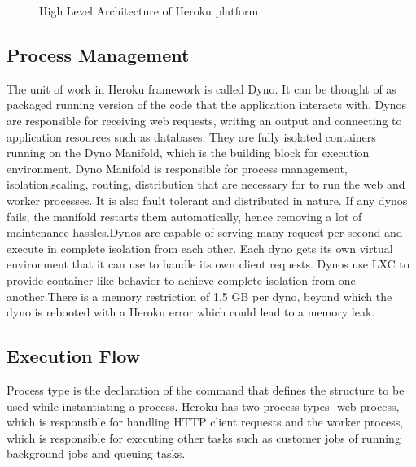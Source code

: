 \documentclass[9pt,twocolumn,twoside]{../../styles/osajnl}
\begin{document}
	\begin{figure}[htbp]
		\centering
		\caption{High Level Architecture of Heroku platform}
		\label{fig:Herokul-arch}
	\end{figure}

	


\subsection{Process Management}
	
	The unit of work in Heroku framework is called Dyno. It can be thought of as
	packaged running version of the code that the application interacts with. Dynos
	are responsible for receiving web requests, writing an output and connecting to
	application resources such as databases. They are fully isolated containers
	running on the Dyno Manifold, which is the building block for execution
	environment. Dyno Manifold is responsible for process management,
	isolation,scaling, routing, distribution that are necessary for to run the web
	and worker processes. It is also fault tolerant and distributed in nature. If
	any dynos fails, the manifold restarts them automatically, hence removing a lot
	of maintenance hassles.Dynos are capable of serving many request per second and
	execute in complete isolation from each other. Each dyno gets its own virtual
	environment that it can use to handle its own client requests. Dynos use LXC 
	to provide container like behavior to achieve complete isolation from one 
	another.There is a memory restriction of 1.5 GB per dyno, beyond which the 
	dyno is rebooted with a Heroku error which could lead to a memory leak.

\subsection{Execution Flow}
	Process type is the declaration of the command that defines the structure to be
	used while instantiating a process. Heroku has two process types- web process,
	which is responsible for handling HTTP client requests and the worker process,
	which is responsible for executing other tasks such as customer jobs of running
	background jobs and queuing tasks.
\end{document}
